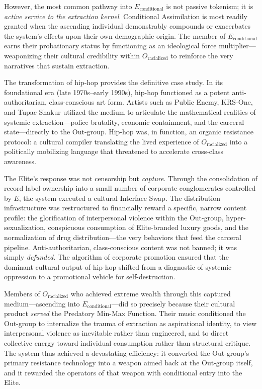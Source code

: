 \documentclass[12pt,openany]{book}
\begin{document}
However, the most common pathway into $E_{\text{conditional}}$ is not passive tokenism; it is \textit{active service to the extraction kernel}. Conditional Assimilation is most readily granted when the ascending individual demonstrably compounds or exacerbates the system's effects upon their own demographic origin. The member of $E_{\text{conditional}}$ earns their probationary status by functioning as an ideological force multiplier---weaponizing their cultural credibility within $O_{\text{racialized}}$ to reinforce the very narratives that sustain extraction.

The transformation of hip-hop provides the definitive case study. In its foundational era (late 1970s--early 1990s), hip-hop functioned as a potent anti-authoritarian, class-conscious art form. Artists such as Public Enemy, KRS-One, and Tupac Shakur utilized the medium to articulate the mathematical realities of systemic extraction---police brutality, economic containment, and the carceral state---directly to the Out-group. Hip-hop was, in function, an organic resistance protocol: a cultural compiler translating the lived experience of $O_{\text{racialized}}$ into a politically mobilizing language that threatened to accelerate cross-class awareness.

The Elite's response was not censorship but \textit{capture}. Through the consolidation of record label ownership into a small number of corporate conglomerates controlled by $E$, the system executed a cultural Interface Swap. The distribution infrastructure was restructured to financially reward a specific, narrow content profile: the glorification of interpersonal violence within the Out-group, hyper-sexualization, conspicuous consumption of Elite-branded luxury goods, and the normalization of drug distribution---the very behaviors that feed the carceral pipeline. Anti-authoritarian, class-conscious content was not banned; it was simply \textit{defunded}. The algorithm of corporate promotion ensured that the dominant cultural output of hip-hop shifted from a diagnostic of systemic oppression to a promotional vehicle for self-destruction.

Members of $O_{\text{racialized}}$ who achieved extreme wealth through this captured medium---ascending into $E_{\text{conditional}}$---did so precisely because their cultural product \textit{served} the Predatory Min-Max Function. Their music conditioned the Out-group to internalize the trauma of extraction as aspirational identity, to view interpersonal violence as inevitable rather than engineered, and to direct collective energy toward individual consumption rather than structural critique. The system thus achieved a devastating efficiency: it converted the Out-group's primary resistance technology into a weapon aimed back at the Out-group itself, and it rewarded the operators of that weapon with conditional entry into the Elite.
\end{document}
